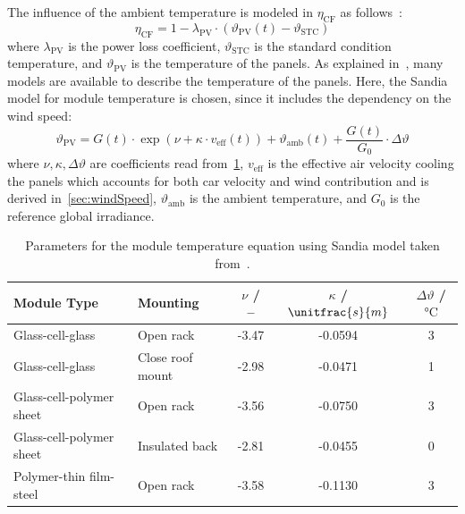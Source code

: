 The influence of the ambient temperature is modeled in $\eta_\mathrm{CF}$ as follows~\cite{PVmodelling:2022misc}:
\begin{equation}
	\eta_\mathrm{CF} = 1 - \lambda_\mathrm{PV} \cdot \left( \vartheta_\mathrm{PV}(t) - \vartheta_\mathrm{STC} \right)
\end{equation}
where $\lambda_\mathrm{PV}$ is the power loss coefficient, $\vartheta_\mathrm{STC}$ is the standard condition temperature, and $\vartheta_\mathrm{PV}$ is the temperature of the panels. As explained in~\cite{PVmodelling:2022misc}, many models are available to describe the temperature of the panels. Here, the Sandia model for module temperature is chosen, since it includes the dependency on the wind speed:
\begin{equation}
	\vartheta_\mathrm{PV} = G(t) \cdot \exp\left(\nu + \kappa \cdot v_\mathrm{eff}(t)\right) + \vartheta_\mathrm{amb}(t) + \frac{G(t)}{G_\mathrm{0}} \cdot \Delta \vartheta \label{eq:modelingPVtempPV}
\end{equation}
where $\nu, \kappa, \Delta \vartheta$ are coefficients read from~\cref{tab:modelingParametersPVSandia}, $v_\mathrm{eff}$ is the effective air velocity cooling the panels which accounts for both car velocity and wind contribution and is derived in~\cref{sec:windSpeed}, $\vartheta_\mathrm{amb}$ is the ambient temperature, and $G_\mathrm{0}$ is the reference global irradiance. 
\begin{table}[htbp]
	\centering
	\caption{Parameters for the module temperature equation using Sandia model taken from~\cite{PVmodelling:2022misc, PVlosses:2017article}.}
	\label{tab:modelingParametersPVSandia}
	
	\begin{tabular}{l l c c c}
		\toprule
		Module Type 				& Mounting 			& $\nu$ / -- 	& $\kappa$ / $\unitfrac{s}{m}$ & $\Delta \vartheta$ / $\unit{\celsius}$ \\ 
		\midrule
		Glass-cell-glass 			& Open rack 		& -3.47 	& -0.0594 				& 3 \\
		Glass-cell-glass 			& Close roof mount 	& -2.98 	& -0.0471 				& 1 \\
		Glass-cell-polymer sheet 	& Open rack 		& -3.56 	& -0.0750 				& 3 \\
		Glass-cell-polymer sheet 	& Insulated back 	& -2.81 	& -0.0455 				& 0 \\
		Polymer-thin film-steel 	& Open rack 		& -3.58 	& -0.1130 				& 3 \\
		\bottomrule
	\end{tabular}
\end{table}

